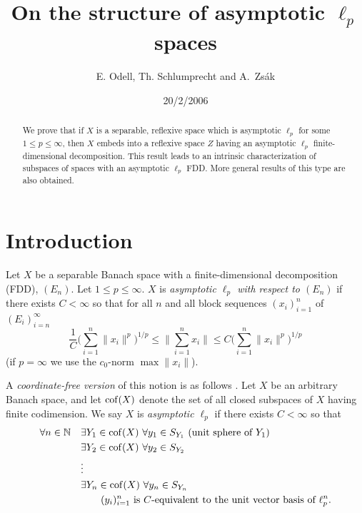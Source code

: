 \documentclass[11pt,leqno]{amsart}
\author{E. Odell, Th. Schlumprecht and A.~Zs\'ak}
\title[Asymptotic $\ell_p$ spaces]{On the structure of asymptotic
  $\ell_p$ spaces}
\theoremstyle{definition}
\newcommand{\N}{\mathbb{N}}
\newcommand{\cof}{{\rm cof}}
\begin{document}
\date{20/2/2006}

\begin{abstract}
  We prove that if $X$ is a separable, reflexive space which is
  asymptotic $\ell_p$ for some $1\le p\le \infty$, then $X$ embeds into
  a reflexive space $Z$ having an asymptotic $\ell_p$
  finite-dimensional decomposition. This result leads to an intrinsic
  characterization of subspaces of  spaces with an  asymptotic
  $\ell_p$ FDD. More general results of this type are also obtained.
\end{abstract}
\maketitle
\section{Introduction}\label{S:1}

Let $X$ be a separable Banach space with a finite-dimensional decomposition
(FDD), $(E_n)$. Let $1\le p\le \infty$. $X$ is {\em asymptotic
  $\ell_p$  with respect to $(E_n)$} \cite{MT} if there exists
$C<\infty$ so that for all $n$ and all block sequences $(x_i)_{i=1}^n$
of $(E_i)_{i=n}^\infty$
$$ \frac1C\Big(\sum_{i=1}^n \|x_i\|^p\Big)^{1/p}\le
\Big\|\sum_{i=1}^n x_i\Big\|\le C\Big(\sum_{i=1}^n \|x_i\|^p\Big)^{1/p}$$
(if $p=\infty$ we use the $c_0$-norm $\max \|x_i\|$).

A {\em coordinate-free version} of this notion is as follows
\cite{MMT}. Let $X$ be an arbitrary Banach space, and let $\cof(X)$
denote the set of all closed  subspaces of $X$ having finite
codimension.
We say $X$ is {\em asymptotic $\ell_p$ }if there exists $C<\infty$ so that
\begin{align}\label{E:1.1}
  \forall n\in\N\quad&\exists Y_1\in \cof(X)\ \forall y_1\in S_{Y_1}
  \text{ (unit sphere of $Y_1$)}\\
  &\exists Y_2\in \cof(X)\ \forall y_2\in S_{Y_2} \notag \\
  &\vdots \notag\\
  &\exists Y_n\in \cof(X)\ \forall y_n\in S_{Y_n} \notag\\
  &\qquad (y_i)_{i=1}^n \text{ is $C$-equivalent to the unit vector
    basis of $\ell_p^n$.} \notag
\end{align}
\end{document}
